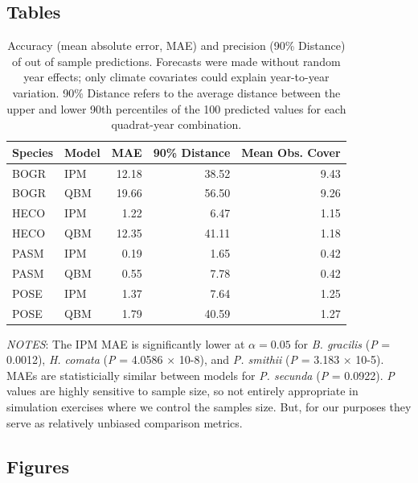 \documentclass[12pt,]{article}
\begin{document}
\subsection{Tables}\label{tables}

\begin{table}[ht]
\centering
\caption{Accuracy (mean absolute error, MAE) and precision (90\% Distance) of out of sample predictions. Forecasts were made without random year effects; only climate covariates could explain year-to-year variation. 90\% Distance refers to the average distance between the upper and lower 90th percentiles of the 100 predicted values for each quadrat-year combination.} 
\begin{tabular}{llrrr}
  \hline
Species & Model & MAE & 90\% Distance & Mean Obs. Cover \\ 
  \hline
BOGR & IPM & 12.18 & 38.52 & 9.43 \\ 
  BOGR & QBM & 19.66 & 56.50 & 9.26 \\ 
  HECO & IPM & 1.22 & 6.47 & 1.15 \\ 
  HECO & QBM & 12.35 & 41.11 & 1.18 \\ 
  PASM & IPM & 0.19 & 1.65 & 0.42 \\ 
  PASM & QBM & 0.55 & 7.78 & 0.42 \\ 
  POSE & IPM & 1.37 & 7.64 & 1.25 \\ 
  POSE & QBM & 1.79 & 40.59 & 1.27 \\ 
   \hline
\end{tabular}
\end{table}

\emph{NOTES}: The IPM MAE is significantly lower at $\alpha=0.05$ for
\emph{B. gracilis} (\emph{P} = 0.0012), \emph{H. comata} (\emph{P} =
4.0586 × 10-8), and \emph{P. smithii} (\emph{P} = 3.183 × 10-5). MAEs
are statisticially similar between models for \emph{P. secunda}
(\emph{P} = 0.0922). \emph{P} values are highly sensitive to sample
size, so not entirely appropriate in simulation exercises where we
control the samples size. But, for our purposes they serve as relatively
unbiased comparison metrics.

\pagebreak{}

\pagebreak{}

\subsection{Figures}\label{figures}
\end{document}
